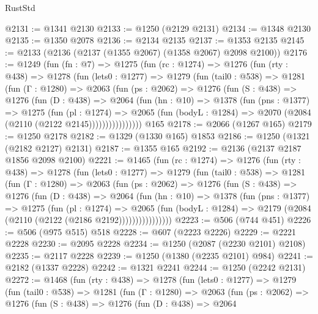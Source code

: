 \begin{lexlean}{RustStd}
\begin{coremodule}
@2131 := @1341 @2130
@2133 := @1250 (@2129 @2131)
@2134 := @1348 @2130
@2135 := @1350 @2078
@2136 := @2134 @2135
@2137 := @1353 @2135
@2145 := @2133 (@2136 (@2137 (@1355 @2067) (@1358 @2067) @2098 @2100))
@2176 := @1249
    (fun (fn : @7) =>
    @1275
      (fun (rc : @1274) =>
      @1276
        (fun (rty : @438) =>
        @1278
          (fun (lets0 : @1277) =>
          @1279
            (fun (tail0 : @538) =>
            @1281
              (fun (Γ : @1280) =>
              @2063
                (fun (ps : @2062) =>
                @1276
                  (fun (S : @438) =>
                  @1276
                    (fun (D : @438) =>
                    @2064
                      (fun (hn : @10) =>
                      @1378
                        (fun (pns : @1377) =>
                        @1275
                          (fun (pl : @1274) =>
                          @2065
                            (fun (bodyL : @1284) => @2070 (@2084 (@2110 (@2122 @2145))))))))))))))))
    @165
@2178 := @2066 (@1267 @165)
@2179 := @1250 @2178
@2182 := @1329 (@1330 @165) @1853
@2186 := @1250 (@1321 (@2182 @2127) @2131)
@2187 := @1355 @165
@2192 := @2136 (@2137 @2187 @1856 @2098 @2100)
@2221 := @1465
    (fun (rc : @1274) =>
    @1276
      (fun (rty : @438) =>
      @1278
        (fun (lets0 : @1277) =>
        @1279
          (fun (tail0 : @538) =>
          @1281
            (fun (Γ : @1280) =>
            @2063
              (fun (ps : @2062) =>
              @1276
                (fun (S : @438) =>
                @1276
                  (fun (D : @438) =>
                  @2064
                    (fun (hn : @10) =>
                    @1378
                      (fun (pns : @1377) =>
                      @1275
                        (fun (pl : @1274) =>
                        @2065
                          (fun (bodyL : @1284) =>
                          @2179 (@2084 (@2110 (@2122 (@2186 @2192))))))))))))))))
@2223 := @506 (@744 @451)
@2226 := @506 (@975 @515) @518
@2228 := @607 (@2223 @2226)
@2229 := @2221 @2228
@2230 := @2095 @2228
@2234 := @1250 (@2087 (@2230 @2101) @2108)
@2235 := @2117 @2228
@2239 := @1250 (@1380 (@2235 @2101) @984)
@2241 := @2182 (@1337 @2228)
@2242 := @1321 @2241
@2244 := @1250 (@2242 @2131)
@2272 := @1468
    (fun (rty : @438) =>
    @1278
      (fun (lets0 : @1277) =>
      @1279
        (fun (tail0 : @538) =>
        @1281
          (fun (Γ : @1280) =>
          @2063
            (fun (ps : @2062) =>
            @1276
              (fun (S : @438) =>
              @1276
                (fun (D : @438) =>
                @2064

\end{coremodule}
\end{lexlean}
